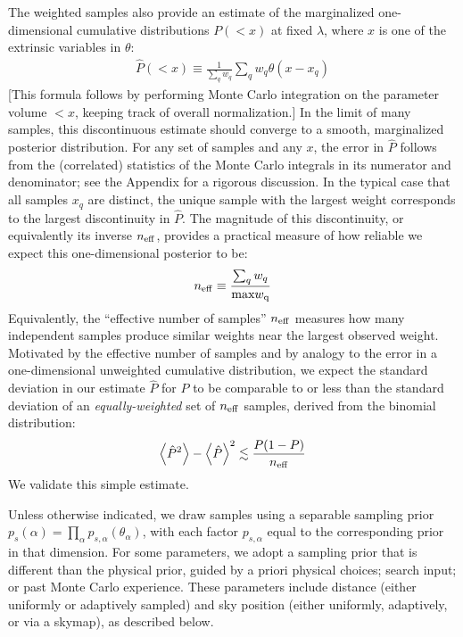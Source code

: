 The weighted samples also provide an estimate of the marginalized one-dimensional cumulative distributions $P(<x)$ at
fixed $\lambda$, where $x$ is one of the extrinsic variables in $\theta$:
\begin{eqnarray}
\hat{P}(<x) \equiv \frac{1}{\sum_q w_q} \sum_q w_q \theta(x-x_q)
\end{eqnarray}
[This formula follows by performing Monte Carlo integration on the parameter volume $<x$, keeping track of overall
  normalization.]  
In the limit of many samples, this discontinuous estimate should converge to a smooth, marginalized posterior
  distribution.  
%
For any set of samples and any $x$, the error in $\hat{P}$ follows from the (correlated) statistics of the Monte Carlo
integrals in its numerator and denominator; see the Appendix for a rigorous discussion. 
In the typical case that all samples $x_q$ are distinct, the unique sample with the largest weight corresponds to the
largest discontinuity in $\hat{P}$.  The magnitude of this discontinuity, or equivalently its inverse $n_{\rm eff}$,
provides a practical measure of how reliable we expect this one-dimensional posterior to be:
\begin{eqnarray}
n_{\rm eff} \equiv \frac{\sum_q w_q}{\text{max} w_{\rm q}}
\end{eqnarray}
Equivalently, the ``effective number of samples'' $n_{\rm eff}$ measures how many independent samples produce similar
weights near the largest observed weight.  
%
Motivated by the effective number of samples and by analogy to the error in a one-dimensional unweighted cumulative
distribution, we expect the standard deviation in our estimate $\hat{P}$ for $P$ to be comparable to or less than the
standard deviation of an \emph{equally-weighted} set of $n_{\rm eff}$ samples,  derived from the binomial distribution:
\begin{eqnarray}
\label{eq:ErrorEstimateCumulative}
\left<\hat{P}^2\right > - \left<\hat{P} \right>^2 \lesssim \frac{P(1-P)}{n_{\rm eff}}
\end{eqnarray}
We  validate this simple estimate.  


%
Unless otherwise indicated, we draw samples using a separable sampling prior $p_s(\alpha) =
\prod_{\alpha}p_{s,\alpha}(\theta_\alpha)$, with each factor $p_{s,\alpha}$ equal to the corresponding prior in that
dimension. 
For some parameters, we adopt a sampling prior that is different than the physical prior, guided by a priori physical
choices; search input;  or past Monte Carlo experience.  These parameters include 
distance (either uniformly or adaptively sampled) and sky position (either uniformly, adaptively, or via a skymap), as
described below.
%

